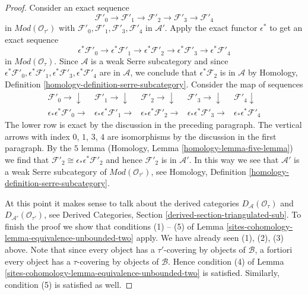 \begin{proof}
\medskip\noindent
Consider an exact sequence
$$
\mathcal{F}'_0 \to \mathcal{F}'_1 \to
\mathcal{F}'_2 \to \mathcal{F}'_3 \to
\mathcal{F}'_4
$$
in $\textit{Mod}(\mathcal{O}_{\tau'})$ with
$\mathcal{F}'_0, \mathcal{F}'_1, \mathcal{F}'_3, \mathcal{F}'_4$ in
$\mathcal{A}'$. Apply the exact functor $\epsilon^*$ to get
an exact sequence
$$
\epsilon^*\mathcal{F}'_0 \to \epsilon^*\mathcal{F}'_1 \to
\epsilon^*\mathcal{F}'_2 \to \epsilon^*\mathcal{F}'_3 \to
\epsilon^*\mathcal{F}'_4
$$
in $\textit{Mod}(\mathcal{O}_\tau)$. Since $\mathcal{A}$ is
a weak Serre subcategory and since
$\epsilon^*\mathcal{F}'_0, \epsilon^*\mathcal{F}'_1,
\epsilon^*\mathcal{F}'_3, \epsilon^*\mathcal{F}'_4$ are in
$\mathcal{A}$, we conclude that $\epsilon^*\mathcal{F}_2$
is in $\mathcal{A}$ by
Homology, Definition \ref{homology-definition-serre-subcategory}.
Consider the map of sequences
$$
\begin{array}{ccccc}\mathcal{F}'_0 \longrightarrow\downarrow & \mathcal{F}'_1 \longrightarrow\downarrow & \mathcal{F}'_2 \longrightarrow\downarrow & \mathcal{F}'_3 \longrightarrow\downarrow & \mathcal{F}'_4 \downarrow \\ \epsilon_*\epsilon^*\mathcal{F}'_0 \longrightarrow & \epsilon_*\epsilon^*\mathcal{F}'_1 \longrightarrow & \epsilon_*\epsilon^*\mathcal{F}'_2 \longrightarrow & \epsilon_*\epsilon^*\mathcal{F}'_3 \longrightarrow & \epsilon_*\epsilon^*\mathcal{F}'_4\end{array}
$$
The lower row is exact by the discussion in the preceding
paragraph. The vertical arrows with index $0$, $1$, $3$, $4$
are isomorphisms by the discussion in the first paragraph.
By the $5$ lemma (Homology, Lemma \ref{homology-lemma-five-lemma})
we find that $\mathcal{F}'_2 \cong \epsilon_*\epsilon^*\mathcal{F}'_2$
and hence $\mathcal{F}'_2$ is in $\mathcal{A}'$.
In this way we see that $\mathcal{A}'$ is a weak Serre subcategory
of $\textit{Mod}(\mathcal{O}_{\tau'})$, see
Homology, Definition \ref{homology-definition-serre-subcategory}.

\medskip\noindent
At this point it makes sense to talk about the
derived categories $D_\mathcal{A}(\mathcal{O}_\tau)$ and
$D_{\mathcal{A}'}(\mathcal{O}_{\tau'})$, see
Derived Categories, Section \ref{derived-section-triangulated-sub}.
To finish the proof we show that conditions
(1) -- (5) of Lemma \ref{sites-cohomology-lemma-equivalence-unbounded-two} apply.
We have already seen (1), (2), (3) above.
Note that since every object has a $\tau'$-covering
by objects of $\mathcal{B}$, a fortiori every object has
a $\tau$-covering by objects of $\mathcal{B}$. Hence
condition (4) of Lemma \ref{sites-cohomology-lemma-equivalence-unbounded-two} is satisfied.
Similarly, condition (5) is satisfied as well.
\end{proof}

